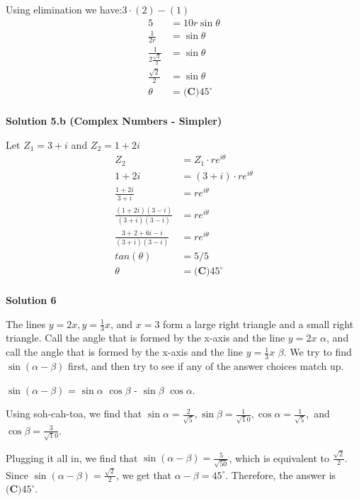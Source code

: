\begin{enumerate}
 Using elimination we have:$3\cdot(2) - (1)$
 \begin{align*} 5 &= 10r\sin\theta \\ \frac{1}{2r} &= \sin\theta \\ \frac{1}{2\frac{\sqrt{2}}{2}} &= \sin\theta \\ \frac{\sqrt{2}}{2} &= \sin\theta \\ \theta &= \boxed{\textbf{(C)}  45^\circ} \\ \end{align*}





\textbf{Solution 5.b (Complex Numbers - Simpler)}

Let $Z_1 = 3 + i$ and $Z_2 = 1 + 2i$
 \begin{align*} Z_2  &= Z_1 \cdot re^{i\theta} \\ 1+2i &=(3+i) \cdot re^{i\theta} \\ \frac{1+2i}{3+i} &= re^{i\theta} \\ \frac{(1+2i)(3-i)}{(3+i)(3-i)} &= re^{i\theta} \\ \frac{3+2+6i-i}{(3+i)(3-i)} &= re^{i\theta} \\   tan(\theta) &= 5/5  \\  \theta  &= \boxed{\textbf{(C)}  45^\circ} \\ \end{align*}





\textbf{Solution 6}

The lines $y = 2x, y = \frac {1}{3}x$, and $x = 3$ form a large right triangle and a small right triangle. Call the angle that is formed by the x-axis and the line $y = 2x$ $\alpha$, and call the angle that is formed by the x-axis and the line $y = \frac {1}{3}x$ $\beta$. We try to find $\sin (\alpha - \beta)$ first, and then try to see if any of the answer choices match up. 

 $\sin (\alpha - \beta)$ = $\sin \alpha$ $\cos \beta$ - $\sin \beta$ $\cos \alpha$. 

 Using soh-cah-toa, we find that $\sin \alpha = \frac {2}{\sqrt 5}, \sin \beta = \frac {1}{\sqrt 10}, \cos \alpha = \frac {1}{\sqrt 5},$ and $\cos \beta = \frac {3}{\sqrt 10}$. 

 Plugging it all in, we find that $\sin (\alpha - \beta) = \frac {5}{\sqrt {50}}$, which is equivalent to $\frac {\sqrt 2}{2}$. Since $\sin (\alpha - \beta) = \frac {\sqrt 2}{2}$, we get that $\alpha - \beta = 45^{\circ}$. Therefore, the answer is $\boxed {\textbf {(C)} 45^{\circ}}$. 


\end{enumerate}
